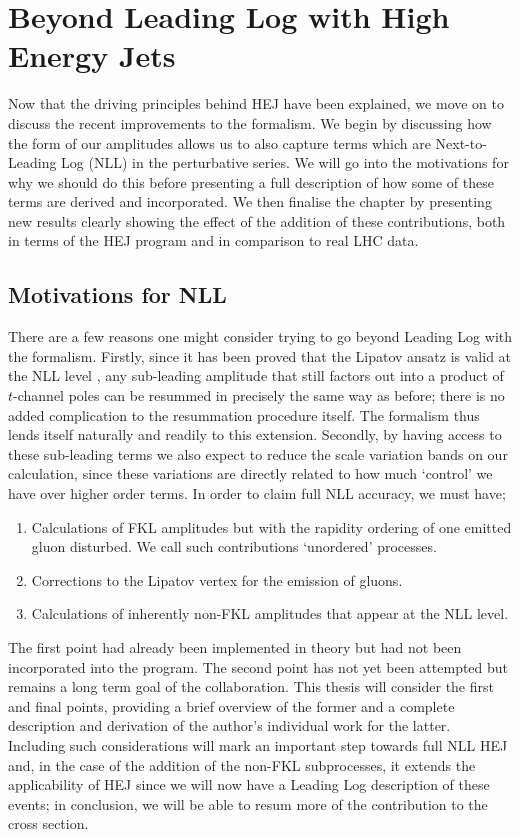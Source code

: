 \chapter{Beyond Leading Log with High Energy Jets}

Now that the driving principles behind HEJ have been explained, we move on to discuss the recent improvements to the formalism. We begin by discussing how the form of our amplitudes allows us to also capture terms which are Next-to-Leading Log (NLL) in the perturbative series. We will go into the motivations for why we should do this before presenting a full description of how some of these terms are derived and incorporated. We then finalise the chapter by presenting new results clearly showing the effect of the addition of these contributions, both in terms of the HEJ program and in comparison to real LHC data. 

\section{Motivations for NLL}

There are a few reasons one might consider trying to go beyond Leading Log with the formalism. Firstly, since it has been proved that the Lipatov ansatz is valid at the NLL  level \cite{Fadin2006}, any sub-leading amplitude that still factors out into a product of $t$-channel poles can be resummed in precisely the same way as before; there is no added complication to the resummation procedure itself. The formalism thus lends itself naturally and readily to this extension. Secondly, by having access to these sub-leading terms we also expect to reduce the scale variation bands on our calculation, since these variations are directly related to how much `control' we have over higher order terms. In order to claim full NLL accuracy, we must have;

\begin{enumerate}
\item{Calculations of FKL amplitudes but with the rapidity ordering of one emitted gluon disturbed. We call such contributions `unordered' processes.}
\item{Corrections to the Lipatov vertex for the emission of gluons.}
\item{Calculations of inherently non-FKL amplitudes that appear at the NLL level.}
\end{enumerate}

The first point had already been implemented in theory but had not been incorporated into the program. The second point has not yet been attempted but remains a long term goal of the collaboration. This thesis will consider the first and final points, providing a brief overview of the former and a complete description and derivation of the author's individual work for the latter. Including such considerations will mark an important step towards full NLL HEJ and, in the case of the addition of the non-FKL subprocesses, it extends the applicability of HEJ since we will now have a Leading Log description of these events; in conclusion, we will be able to resum more of the contribution to the cross section. 

